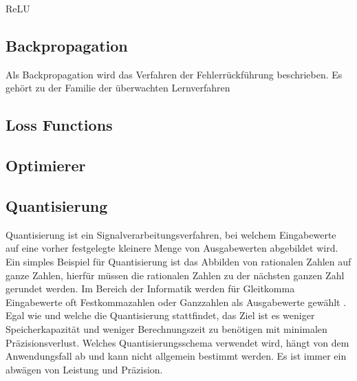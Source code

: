 \ac{ReLU}

\subsection{Backpropagation}
Als Backpropagation wird das Verfahren der Fehlerrückführung beschrieben. Es gehört zu der Familie der überwachten Lernverfahren





\subsection{Loss Functions}

\subsection{Optimierer}


\subsection{Quantisierung}

Quantisierung ist ein Signalverarbeitungsverfahren, bei welchem Eingabewerte auf eine vorher festgelegte kleinere Menge von Ausgabewerten abgebildet wird. Ein simples Beispiel für Quantisierung ist das Abbilden von rationalen Zahlen auf ganze Zahlen, hierfür müssen die rationalen Zahlen zu der nächsten ganzen Zahl gerundet werden. Im Bereich der Informatik werden für Gleitkomma Eingabewerte oft Festkommazahlen oder Ganzzahlen als Ausgabewerte gewählt \cite{Gysel2016}. Egal wie und welche die Quantisierung stattfindet, das Ziel ist es weniger Speicherkapazität und weniger Berechnungszeit zu benötigen mit minimalen Präzisionsverlust. Welches Quantisierungsschema verwendet wird, hängt von dem Anwendungsfall ab und kann nicht allgemein bestimmt werden. Es ist immer ein abwägen von Leistung und Präzision.

